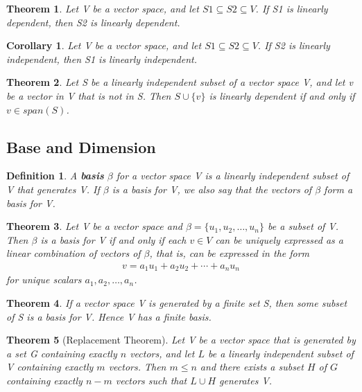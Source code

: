 \documentclass{article}
\newcommand{\bd}[1]{\textbf{#1}}
\theoremstyle{plain}
\newtheorem{theorem}{Theorem}[section]
\newtheorem*{corollary}{Corollary}
\newtheorem*{definition1}{Definition}
\theoremstyle{plain} %
\begin{document}
\begin{theorem}
Let V be a vector space, and let $S1 \subseteq S2 \subseteq V$. If S1 is linearly dependent, then S2 is linearly dependent.
\end{theorem}

\begin{corollary}
Let V be a vector space, and let $S1 \subseteq S2 \subseteq V$. If S2 is linearly independent, then S1 is linearly independent.
\end{corollary}

\begin{theorem}
Let S be a linearly independent subset of a vector space V, and let v be a vector in V that is not in S. Then $S \cup \{v\}$ is linearly dependent if and only if $v \in span(S)$.
\end{theorem}

\subsection{Base and Dimension}

\begin{definition1}
A \bd{basis} $\beta$ for a vector space V is a linearly independent subset of V that generates V. If $\beta$ is a basis for V, we also say that the vectors of $\beta$ form a basis for V.
\end{definition1}

\begin{theorem}
Let V be a vector space and $\beta = \{u_1, u_2,\ldots,u_n\}$ be a subset of V. Then $\beta$ is a basis for V if and only if each $v \in V$ can be uniquely expressed as a linear combination of vectors of $\beta$, that is, can be expressed in
the form
\begin{align*}
v = a_1u_1 + a_2u_2 + \cdots + a_nu_n
\end{align*}
for unique scalars $a_1, a_2,\ldots,a_n$.
\end{theorem}

\begin{theorem}
If a vector space V is generated by a finite set S, then some subset of S is a basis for V. Hence V has a finite basis.
\end{theorem}

\begin{theorem}[Replacement Theorem] 
Let V be a vector space that is generated by a set G containing exactly $n$ vectors, and let $L$ be a linearly independent subset of V containing exactly $m$ vectors. Then $m \leq n$ and there exists a subset $H$ of $G$ containing exactly $n - m$ vectors such that $L \cup H$ generates V.
\end{theorem}
\end{document}

